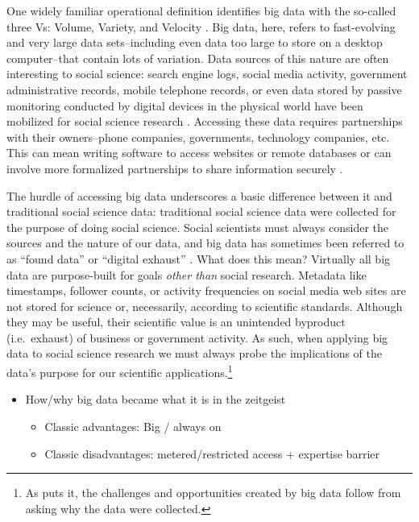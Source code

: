 \documentclass[12pt,]{article}
\providecommand{\tightlist}{%
  \setlength{\itemsep}{0pt}\setlength{\parskip}{0pt}}
\let\rmarkdownfootnote\footnote%
\def\footnote{\protect\rmarkdownfootnote}
\begin{document}
One widely familiar operational definition identifies big data with the
so-called three Vs: Volume, Variety, and Velocity \citep{laney01}. Big
data, here, refers to fast-evolving and very large data sets--including
even data too large to store on a desktop computer--that contain lots of
variation. Data sources of this nature are often interesting to social
science: search engine logs, social media activity, government
administrative records, mobile telephone records, or even data stored by
passive monitoring conducted by digital devices in the physical world
have been mobilized for social science research \citep{salganik17}.
Accessing these data requires partnerships with their owners--phone
companies, governments, technology companies, etc. This can mean writing
software to access websites or remote databases or can involve more
formalized partnerships to share information securely \citep{EL14}.

The hurdle of accessing big data underscores a basic difference between
it and traditional social science data: traditional social science data
were collected for the purpose of doing social science. Social
scientists must always consider the sources and the nature of our data,
and big data has sometimes been referred to as ``found data'' or
``digital exhaust'' \citep{harford14}. What does this mean? Virtually
all big data are purpose-built for goals \emph{other than} social
research. Metadata like timestamps, follower counts, or activity
frequencies on social media web sites are not stored for science or,
necessarily, according to scientific standards. Although they may be
useful, their scientific value is an unintended byproduct (i.e.~exhaust)
of business or government activity. As such, when applying big data to
social science research we must always probe the implications of the
data's purpose for our scientific applications.\footnote{As
  \citet{salganik17} puts it, the challenges and opportunities created
  by big data follow from asking why the data were collected.}

\begin{itemize}
\tightlist
\item
  How/why big data became what it is in the zeitgeist

  \begin{itemize}
  \tightlist
  \item
    Classic advantages: Big / always on
  \item
    Classic disadvantages: metered/restricted access + expertise barrier
  \end{itemize}
\end{itemize}
\end{document}
